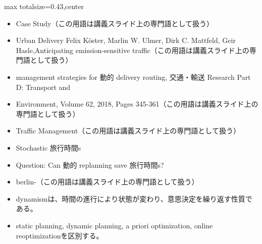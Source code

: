 \clearpage
{}
\begin{minipage}[t]{0.405\textwidth}
\begin{adjustbox}{max totalsize={\textwidth}{0.43\textheight},center}
\begin{minipage}{\textwidth}\scriptsize
{}\begin{itemize}
\item Case Study（この用語は講義スライド上の専門語として扱う）
\item Urban Delivery Felix Köster, Marlin W. Ulmer, Dirk C. Mattfeld, Geir Hasle,Anticipating emission-sensitive traffic（この用語は講義スライド上の専門語として扱う）
\item management strategies for 動的 delivery routing, 交通・輸送 Research Part D: Transport and
\item Environment, Volume 62, 2018, Pages 345-361（この用語は講義スライド上の専門語として扱う）
\item Traffic Management（この用語は講義スライド上の専門語として扱う）
\item Stochastic 旅行時間s
\item Question: Can 動的 replanning save 旅行時間s?
\item berlin-（この用語は講義スライド上の専門語として扱う）
\end{itemize}\begin{itemize}
\item dynamismは、時間の進行により状態が変わり、意思決定を繰り返す性質である。
\item static planning, dynamic planning, a priori optimization, online reoptimizationを区別する。
\end{itemize}
\end{minipage}
\end{adjustbox}
\end{minipage}\hfill
